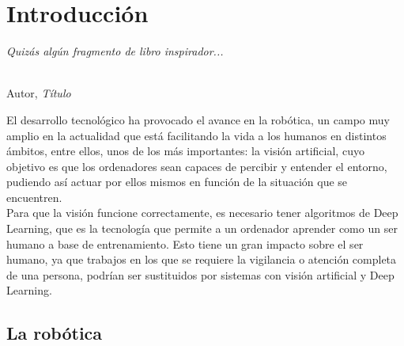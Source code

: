 \chapter{Introducción}
\label{cap:capitulo1}
\setcounter{page}{1}

\begin{flushright}
\begin{minipage}[]{10cm}
\emph{Quizás algún fragmento de libro inspirador...}\\
\end{minipage}\\

Autor, \textit{Título}\\
\end{flushright}

\vspace{1cm}

El desarrollo tecnológico ha provocado el avance en la robótica, un campo muy amplio en la actualidad que está facilitando la vida a los humanos en distintos ámbitos, entre ellos, unos de los más importantes: la visión artificial,  cuyo objetivo es que los ordenadores sean capaces de percibir y entender el entorno, pudiendo así actuar por ellos mismos en función de la situación que se encuentren. \\
Para que la visión funcione correctamente, es necesario tener algoritmos de Deep Learning, que es la tecnología que permite a un ordenador aprender como un ser humano a base de entrenamiento. Esto tiene un gran impacto sobre el ser humano, ya que trabajos en los que se requiere la vigilancia o atención completa de una persona, podrían ser sustituidos por sistemas con visión artificial y Deep Learning.

\section{La robótica}
\label{sec:miseccion} %

